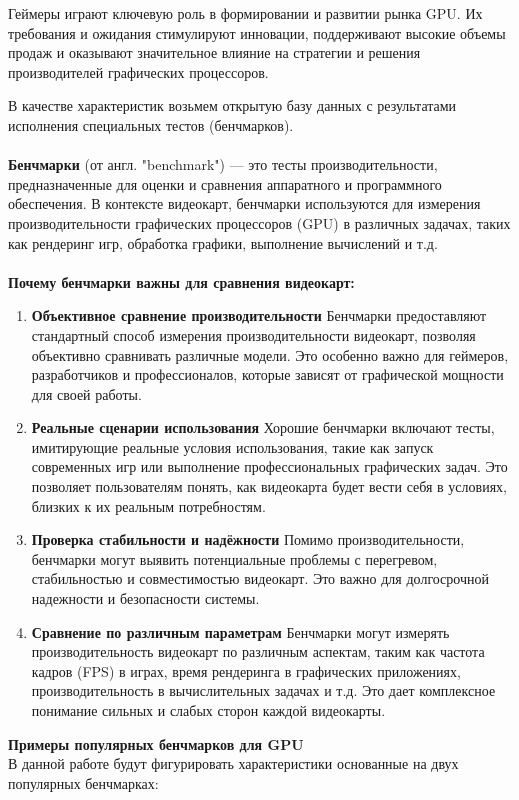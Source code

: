 \documentclass[14pt, a4paper]{extarticle}
\begin{document}
  Геймеры играют ключевую роль в формировании и развитии рынка GPU. Их требования и ожидания стимулируют инновации, поддерживают высокие объемы продаж и оказывают значительное влияние на стратегии и решения производителей графических процессоров.

  В качестве характеристик возьмем открытую базу данных с результатами исполнения специальных тестов (бенчмарков). \\\\
  \textbf{Бенчмарки} (от англ. "benchmark") — это тесты производительности, предназначенные для оценки и сравнения аппаратного и программного обеспечения. В контексте видеокарт, бенчмарки используются для измерения производительности графических процессоров (GPU) в различных задачах, таких как рендеринг игр, обработка графики, выполнение вычислений и т.д.\\\\
  \textbf{Почему бенчмарки важны для сравнения видеокарт:}
  \begin{enumerate}
    \item\textbf{Объективное сравнение производительности} Бенчмарки предоставляют стандартный способ измерения производительности видеокарт, позволяя объективно сравнивать различные модели. Это особенно важно для геймеров, разработчиков и профессионалов, которые зависят от графической мощности для своей работы.
    \item\textbf{Реальные сценарии использования} Хорошие бенчмарки включают тесты, имитирующие реальные условия использования, такие как запуск современных игр или выполнение профессиональных графических задач. Это позволяет пользователям понять, как видеокарта будет вести себя в условиях, близких к их реальным потребностям.
    \item\textbf{Проверка стабильности и надёжности} Помимо производительности, бенчмарки могут выявить потенциальные проблемы с перегревом, стабильностью и совместимостью видеокарт. Это важно для долгосрочной надежности и безопасности системы.
    \item\textbf{Сравнение по различным параметрам} Бенчмарки могут измерять производительность видеокарт по различным аспектам, таким как частота кадров (FPS) в играх, время рендеринга в графических приложениях, производительность в вычислительных задачах и т.д. Это дает комплексное понимание сильных и слабых сторон каждой видеокарты.
  \end{enumerate}
  \textbf{Примеры популярных бенчмарков для GPU}\\
  В данной работе будут фигурировать характеристики основанные на двух популярных бенчмарках:
\end{document}
